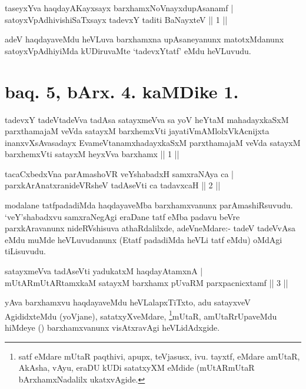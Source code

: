 \begin{shl}
taseyxYva haqdayAKayxsayx barxhamxNoV\s nayxdupAsanamf | \\
satoyxVpAdhivishiSaTxsayx tadevxY taditi BaNayxteV \hfill ||  1 || 
\end{shl}

\begin{artha}
adeV haqdayaveMdu heVLuva barxhamxna upAsaneyanunx matotxMdanunx satoyxVpAdhiyiMda kUDiruvaMte `tadevxYtatf' eMdu heVLuvudu.
\end{artha}

\section*{baq. 5, bArx. 4. kaMDike 1.}
\begin{shl}
tadevxY tadeVtadeVva tadAsa satayxmeVva sa yoV heYtaM mahadayxkaSxM parxthamajaM veVda satayxM barxhemxVti jayatiVmAMlolxVkAcnijxta inanxvXsAvasadayx EvameVtanamxhadayxkaSxM parxthamajaM veVda satayxM barxhemxVti satayxM heyxVva barxhamx || 1 ||
\end{shl}

\begin{shl}
tacaCxbedxVna parAmashoVR veYshabadxH samxraNAya ca | \\
parxkArAnatxranideVRsheV tadAseVti ca tadavxcaH \hfill ||  2 || 
\end{shl}

\begin{artha}
modalane tatfpadadiMda haqdayaveMba barxhamxvanunx parAmashiRsuvudu. `veY'shabadxvu samxraNegAgi eraDane tatf eMba padavu beVre parxkAravanunx nideRVshisuva athaRdalilxde, adeVneMdare:- tadeV tadeVvA\s sa eMdu muMde heVLuvudanunx (Etatf padadiMda heVLi tatf eMdu) oMdAgi tiLisuvudu.
\end{artha}


\begin{shl}
satayxmeVva tadAseVti yadukatxM haqdayAtamxnA | \\
mUtARmUtARtamxkaM satayxM barxhamx pUvaRM parxpacnicxtamf \hfill ||  3 || 
\end{shl}

\begin{artha}
yAva barxhamxvu haqdayaveMdu heVLalapxTiTxto, adu satayxveV AgididxteMdu (yoVjane), satatxyXveMdare, \footnote{satf eMdare mUtaR paqthivi, apupx, teVjasusx, ivu. tayxtf, eMdare amUtaR, AkAsha, vAyu, eraDU kUDi satatxyXM eMdide (mUtARmUtaR bArxhamxNadalilx ukatxvAgide.}mUtaR, amUtaRrUpaveMdu hiMdeye (\quad) barxhamxvanunx visAtxravAgi heVLidAdxgide.
\end{artha}

